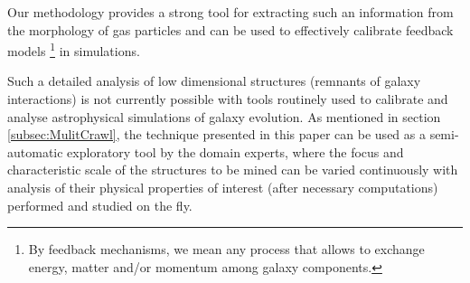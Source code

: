 Our methodology provides a strong tool for extracting such an information from the morphology of gas particles and can be used to effectively calibrate feedback models \footnote{By feedback mechanisms, we mean any process that allows to exchange energy, matter and/or momentum among galaxy components.} in simulations.

Such a detailed analysis of low dimensional structures (remnants of galaxy interactions) is not currently possible with tools routinely used to calibrate and analyse astrophysical simulations of galaxy evolution.
As mentioned in section \ref{subsec:MulitCrawl}, the technique presented in this paper can be used as a semi-automatic exploratory tool by the domain experts, where the focus and characteristic scale of the structures to be mined can be varied continuously with analysis of their physical properties of interest (after necessary computations) performed and studied on the fly.
